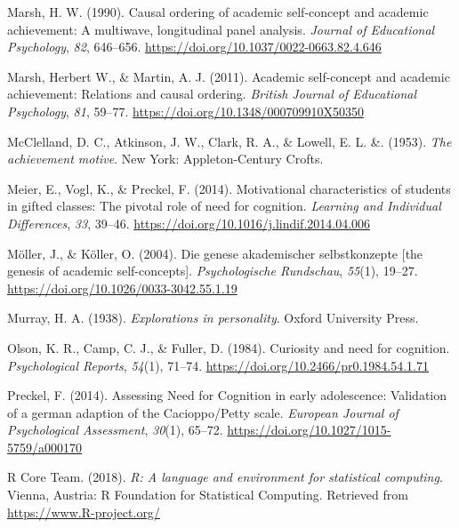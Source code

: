 \documentclass[
  man]{apa6}
\newlength{\cslhangindent}
\newlength{\cslentryspacingunit} %
\newenvironment{CSLReferences}[2] %
 {%
  \setlength{\parindent}{0pt}
  \ifodd #1
  \let\oldpar\par
  \def\par{\hangindent=\cslhangindent\oldpar}
  \fi
  \setlength{\parskip}{#2\cslentryspacingunit}
 }%
 {}
\begin{document}
\begin{CSLReferences}{1}{0}
\leavevmode{}%
Marsh, H. W. (1990). Causal ordering of academic self-concept and academic achievement: A multiwave, longitudinal panel analysis. \emph{Journal of Educational Psychology}, \emph{82}, 646--656. \url{https://doi.org/10.1037/0022-0663.82.4.646}

\leavevmode{}%
Marsh, Herbert W., \& Martin, A. J. (2011). Academic self-concept and academic achievement: Relations and causal ordering. \emph{British Journal of Educational Psychology}, \emph{81}, 59--77. \url{https://doi.org/10.1348/000709910X50350}

\leavevmode{}%
McClelland, D. C., Atkinson, J. W., Clark, R. A., \& Lowell, E. L. \&. (1953). \emph{The achievement motive}. New York: Appleton-Century Crofts.

\leavevmode{}%
Meier, E., Vogl, K., \& Preckel, F. (2014). Motivational characteristics of students in gifted classes: The pivotal role of need for cognition. \emph{Learning and Individual Differences}, \emph{33}, 39--46. \url{https://doi.org/10.1016/j.lindif.2014.04.006}

\leavevmode{}%
Möller, J., \& Köller, O. (2004). Die genese akademischer selbstkonzepte {[}the genesis of academic self-concepts{]}. \emph{Psychologische Rundschau}, \emph{55}(1), 19--27. \url{https://doi.org/10.1026/0033-3042.55.1.19}

\leavevmode{}%
Murray, H. A. (1938). \emph{Explorations in personality}. Oxford University Press.

\leavevmode{}%
Olson, K. R., Camp, C. J., \& Fuller, D. (1984). Curiosity and need for cognition. \emph{Psychological Reports}, \emph{54}(1), 71--74. \url{https://doi.org/10.2466/pr0.1984.54.1.71}

\leavevmode{}%
Preckel, F. (2014). Assessing {Need} for {Cognition} in early adolescence: Validation of a german adaption of the {Cacioppo}/{Petty} scale. \emph{European Journal of Psychological Assessment}, \emph{30}(1), 65--72. \url{https://doi.org/10.1027/1015-5759/a000170}

\leavevmode{}%
R Core Team. (2018). \emph{R: A language and environment for statistical computing}. Vienna, Austria: R Foundation for Statistical Computing. Retrieved from \url{https://www.R-project.org/}


\end{CSLReferences}
\end{document}

